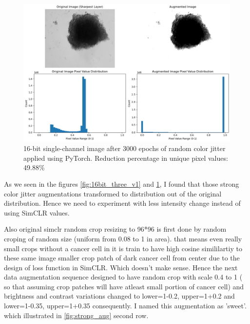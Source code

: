   \begin{figure}[H]
    \centering
    \includegraphics[scale=0.5]{figures/16bit_onen.png} 
    \caption{16-bit single-channel image after 3000 epochs of random color jitter applied using PyTorch. Reduction percentage in unique pixel values: 49.88\%}
    \label{fig:16bit_single_channel}
  \end{figure}

As we seen in the figures  \ref{fig:16bit_three_v1} and \ref{fig:16bit_single_channel}, I found that those strong color jitter augmentations transformed to 
distribution out of the original distribution. Hence we need to experiment with less intensity change instead of using SimCLR values.

Also original simclr random crop resizing to 96*96 is first done by random croping of random size (uniform from 0.08 to 1 in area). that means even really small 
crops without a cancer cell in it is train to have high cosine simililartiy to these same image smaller crop patch of dark cancer cell from center due to the design
 of  loss function in SimCLR. Which doesn't make sense. Hence the next data augmentation sequence designed to have random crop with scale 0.4 to 1 ( so that 
 assuming crop patches will have atleast small portion of cancer cell) and brightness and contrast variations changed to lower=1-0.2, upper=1+0.2 and lower=1-0.35,
  upper=1+0.35 consequently. I named this augmentation as 'sweet'. which illustrated in \ref{fig:strong_aug} second row.

